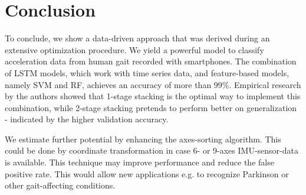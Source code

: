 \section{Conclusion}
To conclude, we show a data-driven approach that was derived during an extensive optimization procedure. We yield a powerful model to classify acceleration data from human gait recorded with smartphones. The combination of \ac{LSTM} models, which work with time series data, and feature-based models, namely \ac{SVM} and \ac{RF}, achieves an accuracy of more than \unit{99}{\%}. Empirical research by the authors showed that 1-stage stacking is the optimal way to implement this combination, while 2-stage stacking pretends to perform better on generalization - indicated by the higher validation accuracy.

We estimate further potential by enhancing the axes-sorting algorithm. This could be done by coordinate transformation in case 6- or 9-axes IMU-sensor-data is available. This technique may improve performance and reduce the false positive rate. This would allow new applications e.g. to recognize Parkinson or other gait-affecting conditions.